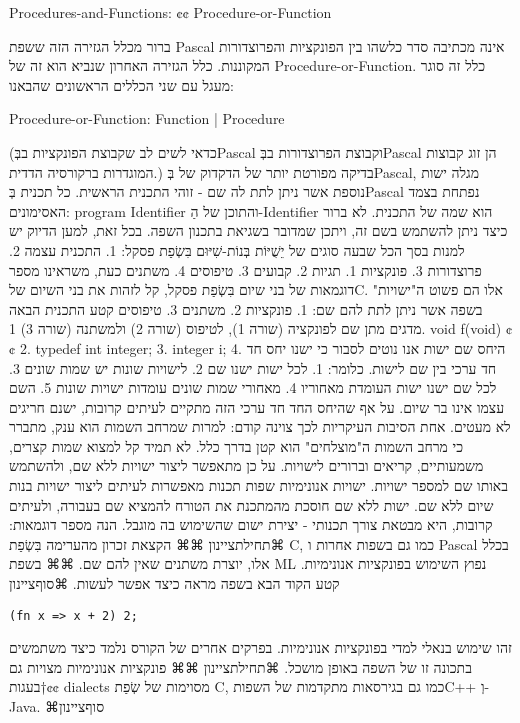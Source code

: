       Procedures-and-Functions:
      {¢¢ Procedure-or-Function }

      ברור מכלל הגזירה הזה ששפת Pascal אינה מכתיבה סדר כלשהו בין הפונקציות והפרוצדורות המקוננות. כלל הגזירה האחרון שנביא הוא זה של Procedure-or-Function. כלל זה סוגר מעגל עם שני הכללים הראשונים שהבאנו:

      Procedure-or-Function:
      Function | Procedure

      (כדאי לשים לב שקבוצת הפונקציות בבְּPascal וקבוצת הפרוצדורות בבְּPascal הן זוג קבוצות המוגדרות ברקורסיה הדדית.)
      בדיקה מפורטת יותר של הדקדוק של בְּPascal, מגלה ישות נוספת אשר ניתן לתת לה שם - זוהי התכנית הראשית. כל תכנית בְּPascal נפתחת בצמד האסימונים: program Identifier והתוכן של הַ-Identifier הוא שמה של התכנית. לא ברור כיצד ניתן להשתמש בשם זה, ויתכן שמדובר בשגיאת בתכנון השפה. בכל זאת, למען הדיוק יש למנות בסך הכל שבעה סוגים של יֵשֻׁיּוֹת בְּנוֹת-שִׁיּוּם בִּשְׂפַת פסקל:
      1. התכנית עצמה
      2. פרוצדורות
      3. פונקציות
      1. תגיות
      2. קבועים
      3. טיפוסים
      4. משתנים
      כעת, משראינו מספר דוגמאות של בני שיום בִּשְׂפַת פסקל, קל לזהות את בני השיום שלC. אלו הם פשוט ה"ישויות" בשפה אשר ניתן לתת להם שם:
      1. פונקציות
      2. משתנים
      3. טיפוסים
      קטע התכנית הבאה מדגים מתן שם לפונקציה (שורה 1), לטיפוס (שורה 2) ולמשתנה (שורה 3)
      1. void f(void) {¢¢
        2. typedef int integer;
        3. integer i;
      4. }
      היחס שם ישות
      אנו נוטים לסבור כי ישנו יחס חד חד ערכי בין שם לישות. כלומר:
      1. לכל ישות ישנו שם
      2. לישויות שונות יש שמות שונים
      3. לכל שם ישנו ישות העומדת מאחוריו
      4. מאחורי שמות שונים עומדות ישויות שונות
      5. השם עצמו אינו בר שיום.
      על אף שהיחס החד חד ערכי הזה מתקיים לעיתים קרובות, ישנם חריגים לא מעטים. אחת הסיבות העיקריות לכך צוינה קודם: למרות שמרחב השמות הוא ענק, מתברר כי מרחב השמות ה"מוצלחים" הוא קטן בדרך כלל. לא תמיד קל למצוא שמות קצרים, משמעותיים, קריאים וברורים לישויות. על כן מתאפשר ליצור ישויות ללא שם, ולהשתמש באותו שם למספר ישויות.
      ישויות אנונימיות
      שפות תכנות מאפשרות לעיתים ליצור ישויות בנות שיום ללא שם. ישות ללא שם חוסכת מהמתכנת את הטורח להמציא שם בעבורה, ולעיתים קרובות, היא מבטאת צורך תכנותי - יצירת ישום שהשימוש בה מוגבל.
      הנה מספר דוגמאות:
      ⌘תחילת{ציינון}
      ⌘⌘ הקצאת זכרון מהערימה בִּשְׂפַת C, כמו גם בשפות אחרות ו Pascal בכלל אלו, יוצרת משתנים שאין להם שם.
      ⌘⌘ בשפת ML נפוץ השימוש בפונקציות אנונימיות. קטע הקוד הבא בשפה מראה כיצד אפשר לעשות.
    ⌘סוף{ציינון}
\begin{verbatim}
(fn x => x + 2) 2;
\end{verbatim}
   זהו שימוש בנאלי למדי בפונקציות אנונימיות. בפרקים אחרים של הקורס נלמד כיצד משתמשים בתכונה זו של השפה באופן מושכל.
                              ⌘תחילת{ציינון}
                              ⌘⌘ פונקציות אנונימיות מצויות גם בעגות†{¢¢ dialects} מסוימות של שְׂפַת C, כמו גם בגירסאות מתקדמות של השפותC++ וְ-Java.
                                ⌘סוף{ציינון}

